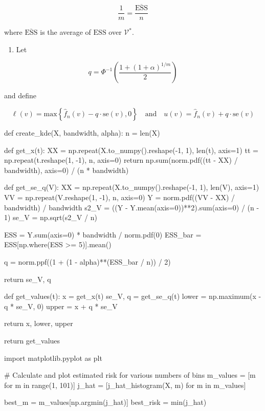 \[ \frac{1}{m} = \frac{\overline{\text{ESS}}}{n} \]

where \(\overline{\text{ESS}}\) is the average of \(\text{ESS}\) over
\(\mathcal{V}^*\).

\begin{enumerate}[tightlist,label={\arabic*.},resume]
\item
  Let
\end{enumerate}

\[ q = \Phi^{-1} \left( \frac{1 + (1 + \alpha)^{1/m}}{2} \right) \]

and define

\[ \ell(v) = \text{max} \left\{ \hat{f}_n(v) - q \cdot \text{se}(v), 0 \right\}
\quad \text{and} \quad
u(v) = \hat{f}_n(v) + q \cdot \text{se}(v)\]

\begin{python}
def create_kde(X, bandwidth, alpha):
    n = len(X)
    
    def get_x(t):
        XX = np.repeat(X.to_numpy().reshape(-1, 1), len(t), axis=1)
        tt = np.repeat(t.reshape(1, -1), n, axis=0)
        return np.sum(norm.pdf((tt - XX) / bandwidth), axis=0) / (n * bandwidth)
    
    def get_se_q(V):
        XX = np.repeat(X.to_numpy().reshape(-1, 1), len(V), axis=1)
        VV = np.repeat(V.reshape(1, -1), n, axis=0)
        Y = norm.pdf((VV - XX) / bandwidth) / bandwidth
        s2_V = ((Y - Y.mean(axis=0))**2).sum(axis=0) / (n - 1)
        se_V = np.sqrt(s2_V / n)

        ESS = Y.sum(axis=0) * bandwidth / norm.pdf(0)
        ESS_bar = ESS[np.where(ESS >= 5)].mean()

        q = norm.ppf((1 + (1 - alpha)**(ESS_bar / n)) / 2)
    
        return se_V, q
    
    def get_values(t):
        x = get_x(t)
        se_V, q = get_se_q(t)
        lower = np.maximum(x - q * se_V, 0)
        upper = x + q * se_V
        
        return x, lower, upper
        
    return get_values
\end{python}

\begin{python}
import matplotlib.pyplot as plt

# Calculate and plot estimated risk for various numbers of bins
m_values = [m for m in range(1, 101)]
j_hat = [j_hat_histogram(X, m) for m in m_values]

best_m = m_values[np.argmin(j_hat)]
best_risk = min(j_hat)
\end{python}

